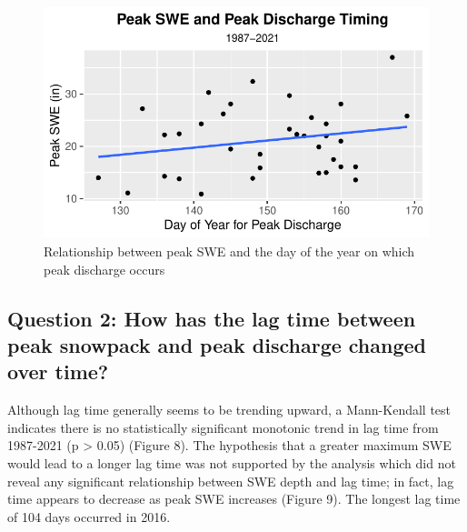 \documentclass[
  12pt,
]{article}
\begin{document}
\begin{figure}
\centering
\includegraphics{McLaughlin_WDA_Project_files/figure-latex/unnamed-chunk-6-1.pdf}
\caption{Relationship between peak SWE and the day of the year on which
peak discharge occurs}
\end{figure}

\newpage

\hypertarget{question-2-how-has-the-lag-time-between-peak-snowpack-and-peak-discharge-changed-over-time}{%
\subsection{Question 2: How has the lag time between peak snowpack and
peak discharge changed over
time?}\label{question-2-how-has-the-lag-time-between-peak-snowpack-and-peak-discharge-changed-over-time}}

Although lag time generally seems to be trending upward, a Mann-Kendall
test indicates there is no statistically significant monotonic trend in
lag time from 1987-2021 (p \textgreater{} 0.05) (Figure 8). The
hypothesis that a greater maximum SWE would lead to a longer lag time
was not supported by the analysis which did not reveal any significant
relationship between SWE depth and lag time; in fact, lag time appears
to decrease as peak SWE increases (Figure 9). The longest lag time of
104 days occurred in 2016.
\end{document}
